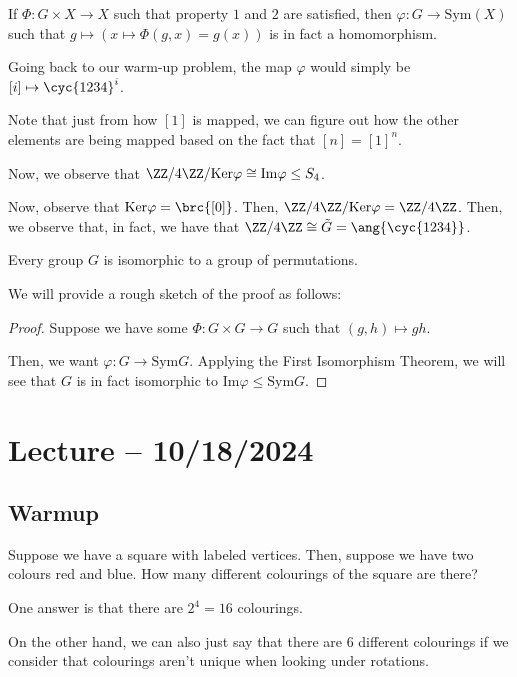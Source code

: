 \documentclass[openany]{book}
\begin{document}
\begin{prop}
	If $\Phi: G \times X \rightarrow X$ such that property $1$ and $2$ are satisfied, then $\varphi : G \rightarrow \mathrm{Sym}(X)$ such that $g \mapsto (x \mapsto \Phi(g,x) = g(x))$ is in fact a homomorphism.
\end{prop}

Going back to our warm-up problem, the map $\varphi$ would simply be $[i] \mapsto \cyc{1 2 3 4}^{i}$.

\begin{rmk}
	Note that just from how $[1]$ is mapped, we can figure out how the other elements are being mapped based on the fact that $[n] = [1]^{n}$.
\end{rmk}

Now, we observe that $\ZZ/4\ZZ / \mathrm{Ker} \varphi \cong \mathrm{Im}\varphi \leq S_4$. 

Now, observe that $\mathrm{Ker}\varphi = \brc{[0]}$. Then, $\ZZ/4\ZZ / \mathrm{Ker}\varphi = \ZZ/4\ZZ$. Then, we observe that, in fact, we have that $\ZZ/4\ZZ \cong \tilde{G} = \ang{\cyc{1 2 3 4}}$.

\begin{thm}
	Every group $G$ is isomorphic to a group of permutations.
\end{thm}

We will provide a rough sketch of the proof as follows:

\begin{proof}
	Suppose we have some $\Phi : G \times G \rightarrow G$ such that $(g, h) \mapsto gh$.
	
	Then, we want $\varphi : G \rightarrow \mathrm{Sym} G$. Applying the First Isomorphism Theorem, we will see that $G$ is in fact isomorphic to $\mathrm{Im}\varphi \leq \mathrm{Sym} G$.
\end{proof}

\section{Lecture -- 10/18/2024}
\subsection{Warmup}
\begin{hw}
	Suppose we have a square with labeled vertices. Then, suppose we have two colours red and blue. How many different colourings of the square are there?
\end{hw}
\begin{solution}
	One answer is that there are $2^{4} = 16$ colourings.
	
	On the other hand, we can also just say that there are 6 different colourings if we consider that colourings aren't unique when looking under rotations.
\end{solution}
\end{document}
